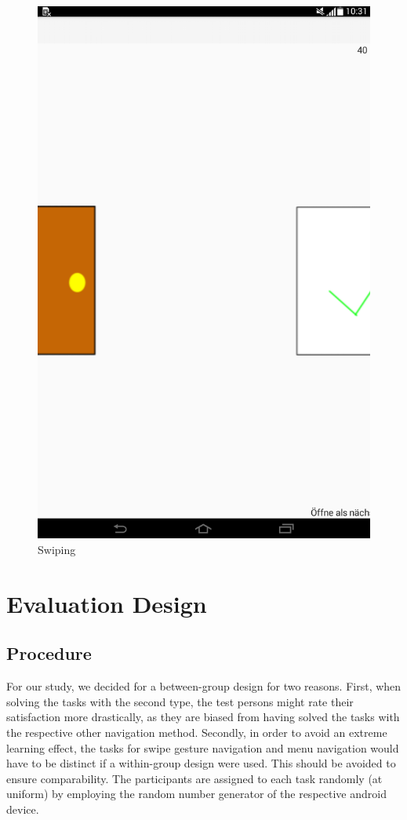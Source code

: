 \documentclass{sig-alternate-05-2015}
\begin{document}
\begin{figure}
	\centering
	\includegraphics[width=0.7\linewidth]{pics/screenshots/swipe}
	\caption{Swiping}
	\label{fig:swipe}
\end{figure}


\section{Evaluation Design}
\subsection{Procedure}
For our study, we decided for a between-group design for two reasons.  First,
when solving the tasks with the second type, the test persons might rate their
satisfaction more drastically, as they are biased from having solved the tasks
with the respective other navigation method.  Secondly, in order to avoid an
extreme learning effect, the tasks for swipe gesture navigation and menu
navigation would have to be distinct if a within-group design were used. This
should be avoided to ensure comparability.  The participants are assigned to
each task randomly (at uniform) by employing the random number generator of
the respective android device.
\end{document}
